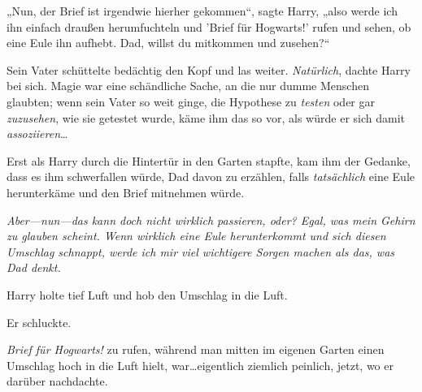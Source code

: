 „Nun, der Brief ist irgendwie hierher gekommen“, sagte Harry, „also werde ich ihn einfach draußen herumfuchteln und 'Brief für Hogwarts!' rufen und sehen, ob eine Eule ihn aufhebt. Dad, willst du mitkommen und zusehen?“

Sein Vater schüttelte bedächtig den Kopf und las weiter. \emph{Natürlich}, dachte Harry bei sich. Magie war eine schändliche Sache, an die nur dumme Menschen glaubten; wenn sein Vater so weit ginge, die Hypothese zu \emph{testen} oder gar \emph{zuzusehen}, wie sie getestet wurde, käme ihm das so vor, als würde er sich damit \emph{assoziieren}…

Erst als Harry durch die Hintertür in den Garten stapfte, kam ihm der Gedanke, dass es ihm schwerfallen würde, Dad davon zu erzählen, falls \emph{tatsächlich} eine Eule herunterkäme und den Brief mitnehmen würde.

\emph{Aber—nun—das kann doch nicht \emph{wirklich} passieren, oder? Egal, was mein Gehirn zu glauben scheint. Wenn wirklich eine Eule herunterkommt und sich diesen Umschlag schnappt, werde ich mir viel wichtigere Sorgen machen als das, was Dad denkt.}

Harry holte tief Luft und hob den Umschlag in die Luft.

Er schluckte.

\emph{Brief für Hogwarts!} zu rufen, während man mitten im eigenen Garten einen Umschlag hoch in die Luft hielt, war…eigentlich ziemlich peinlich, jetzt, wo er darüber nachdachte.

